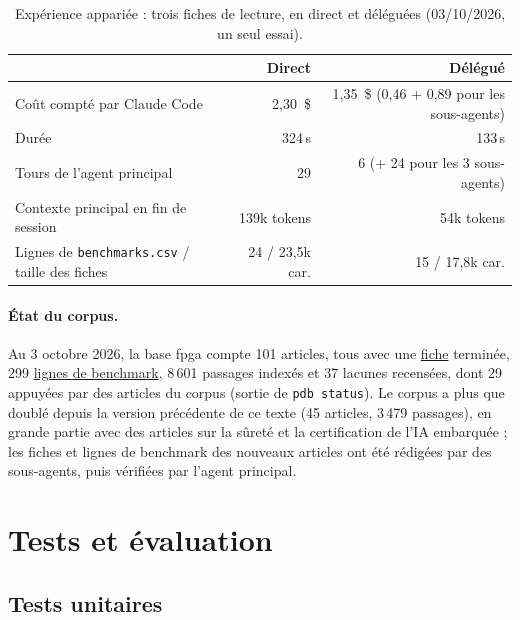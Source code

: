 \documentclass[11pt,a4paper]{article}
\newcommand{\cmd}[1]{\texttt{#1}}
\newcommand{\gl}[2]{\hyperlink{gl:#1}{\textcolor{glcolor}{#2}}}
\begin{document}
\begin{table}[ht]
\centering
\caption{Expérience appariée : trois fiches de lecture, en direct et déléguées (03/10/2026,
un seul essai).}
\label{tab:delegation}
\small
\begin{tabular}{@{}lrr@{}}
\toprule
 & Direct & Délégué \\
\midrule
Coût compté par Claude Code & 2,30~\$ & 1,35~\$ (0,46 + 0,89 pour les sous-agents) \\
Durée & 324\,s & 133\,s \\
Tours de l'agent principal & 29 & 6 (+ 24 pour les 3 sous-agents) \\
Contexte principal en fin de session & 139k tokens & 54k tokens \\
Lignes de \cmd{benchmarks.csv} / taille des fiches & 24 / 23,5k car. & 15 / 17,8k car. \\
\bottomrule
\end{tabular}
\end{table}

\paragraph{État du corpus.} Au 3 octobre 2026, la base fpga compte 101 articles, tous avec
une \gl{fiche}{fiche} terminée, 299 \gl{benchmark}{lignes de benchmark}, 8\,601 passages indexés et 37 lacunes
recensées, dont 29 appuyées par des articles du corpus (sortie de \cmd{pdb status}). Le
corpus a plus que doublé depuis la version précédente de ce texte (45 articles, 3\,479
passages), en grande partie avec des articles sur la sûreté et la certification de l'IA embarquée ;
les fiches et lignes de benchmark des nouveaux articles ont été rédigées par des
sous-agents, puis vérifiées par l'agent principal.

\section{Tests et évaluation}
\label{sec:tests}

\subsection{Tests unitaires}
\end{document}
